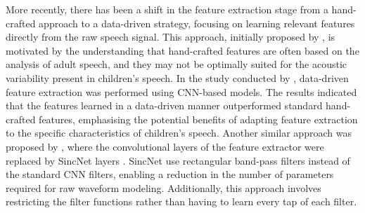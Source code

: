 More recently, there has been a shift in the feature extraction stage from a hand-crafted approach to a data-driven strategy, focusing on learning relevant features directly from the raw speech signal. This approach, initially proposed by \cite{feat_ext_from_raw}, is motivated by the understanding that hand-crafted features are often based on the analysis of adult speech, and they may not be optimally suited for the acoustic variability present in children's speech. In the study conducted by \cite{feat_ext_from_raw}, data-driven feature extraction was performed using \ac{CNN}-based models. The results indicated that the features learned in a data-driven manner outperformed standard hand-crafted features, emphasising the potential benefits of adapting feature extraction to the specific characteristics of children's speech. Another similar approach was proposed by \cite{sincnet_adapt}, where the convolutional layers of the feature extractor were replaced by SincNet layers \cite{Sincnet}. SincNet use rectangular band-pass filters instead of the standard \ac{CNN} filters, enabling a reduction in the number of parameters required for raw waveform modeling. Additionally, this approach involves restricting the filter functions rather than having to learn every tap of each filter. 


